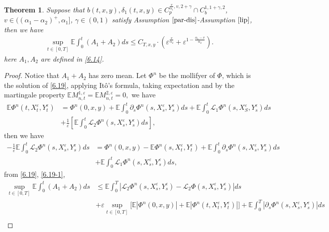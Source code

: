 \documentclass[11pt,reqno]{amsart}
\newtheorem{theorem}{\indent Theorem}[section]
\numberwithin{equation}{section}
\begin{document}
\begin{theorem}\label{T62}
Suppose that $b(t,x,y), \delta_{1}(t,x,y)\in C_{p}^{\frac{v}{\alpha_{1}},v,2+\gamma}\cap C_{b}^{1,1+\gamma,2}$, $v\in((\alpha_{1}-\alpha_{2})^{+},\alpha_{1}]$,  $\gamma\in (0,1)$ satisfy  Assumption $\ref{par-dis}$-Assumption $\ref{lip}$,  then we have 
\begin{align*}
	\sup_{t\in [0,T]}\mathbb{E}\int_{0}^{t}\left(A_{1}+A_{2}\right)ds\leq C_{T,x,y}\cdot  \left(\varepsilon^{\frac{v}{\alpha_{2}}}+\varepsilon^{1-\frac{\alpha_{1}-v}{\alpha_{2}}}\right).
\end{align*}
here $ A_{1}, A_{2}$ are defined in \eqref{6.14}.
\end{theorem}
\begin{proof}
Notice that $A_{1}+A_{2}$  has  zero mean.
Let $\Phi^{n}$ be the mollifyer of $\Phi$, which is the solution of \eqref{6.19}, applying It\^{o}'s formula, taking expectation and by the martingale property $\mathbb{E}M_{n,t}^{1,\varepsilon}=\mathbb{E}M_{n,t}^{2,\varepsilon}=0,$ we have
\begin{align*}
	\mathbb{E}\Phi^{n}(t,X_{t}^{\varepsilon},Y_{t}^{\varepsilon})	&=\Phi^{n}(0,x,y)+\mathbb{E}\int_{0}^{t}\partial_{s}\Phi^{n}(s,X_{s}^{\varepsilon},Y_{s}^{\varepsilon})ds+\mathbb{E}\int_{0}^{t} \mathcal{L}_{1}\Phi^{n}(s,X_{S}^{\varepsilon},Y_{s}^{\varepsilon})ds\\
	&+\frac{1}{\varepsilon}\left[ \mathbb{E}\int_{0}^{t}\mathcal{L}_{2}\Phi^{n}(s,X_{s}^{\varepsilon},Y_{s}^{\varepsilon})ds\right],
\end{align*}
then we have
\begin{align*}
	-\frac{1}{\varepsilon} \mathbb{E}\int_{0}^{t}\mathcal{L}_{2}\Phi^{n}(s,X_{s}^{\varepsilon},Y_{s}^{\varepsilon})ds&	=\Phi^{n}(0,x,y)-\mathbb{E}\Phi^{n}(s,X_{t}^{\varepsilon},Y_{t}^{\varepsilon})+\mathbb{E}\int_{0}^{t}\partial_{s}\Phi^{n}(s,X_{s}^{\varepsilon},Y_{s}^{\varepsilon})ds\\
	&+\mathbb{E}\int_{0}^{t} \mathcal{L}_{1}\Phi^{n}(s,X_{s}^{\varepsilon},Y_{s}^{\varepsilon})ds,
\end{align*}
from \eqref{6.19}, \eqref{6.19-1}, 
\begin{align*}
	\sup_{t\in [0,T]}\mathbb{E}\int_{0}^{t}\left(A_{1}+A_{2}\right)ds	&\leq\mathbb{E} \int_{0}^{T}\left|\mathcal{L}_{2}\Phi^{n}(s,X_{s}^{\varepsilon},Y_{s}^{\varepsilon})-\mathcal{L}_{2}\Phi(s,X_{s}^{\varepsilon},Y_{s}^{\varepsilon})\right|ds\\
	&+\varepsilon\sup_{t\in [0,T]}\big[ \mathbb{E}|\Phi^{n}(0,x,y)|+\mathbb{E}|\Phi^{n}(t,X_{t}^{\varepsilon},Y_{t}^{\varepsilon})|\big]  +\mathbb{E}\int_{0}^{T}|\partial_{s}\Phi^{n}(s,X_{s}^{\varepsilon},Y_{s}^{\varepsilon})|ds\\

\end{align*}
\end{proof}
\end{document}
